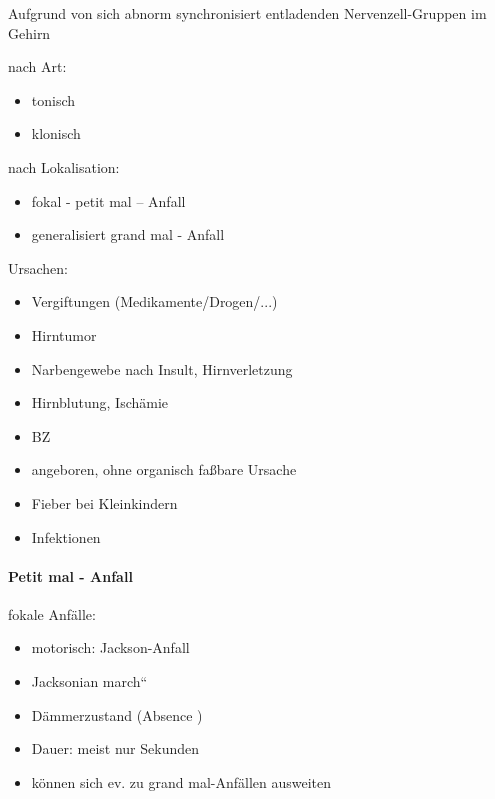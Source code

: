 \documentclass{article}
\begin{document}
Aufgrund von sich abnorm synchronisiert  entladenden Nervenzell-Gruppen
im  Gehirn

nach Art:

\begin{itemize}
\item tonisch

\item klonisch

\end{itemize}
nach Lokalisation:

\begin{itemize}
\item fokal - petit mal -- Anfall

\item generalisiert grand mal - Anfall 

\end{itemize}
Ursachen:

\begin{itemize}
\item Vergiftungen (Medikamente/Drogen/...)

\item Hirntumor

\item Narbengewebe nach Insult, Hirnverletzung

\item Hirnblutung, Isch\"amie

\item BZ 

\item angeboren, ohne organisch fa{\ss}bare  Ursache

\item Fieber bei Kleinkindern

\item Infektionen

\end{itemize}
\paragraph{Petit mal - Anfall}
fokale Anf\"alle:

\begin{itemize}
\item motorisch: Jackson-Anfall

\item {\quotedblbase}Jacksonian march{\textquotedblleft}

\item D\"ammerzustand (Absence )

\item Dauer: meist nur Sekunden

\item k\"onnen sich ev. zu grand mal-Anf\"allen  ausweiten

\end{itemize}
\end{document}

